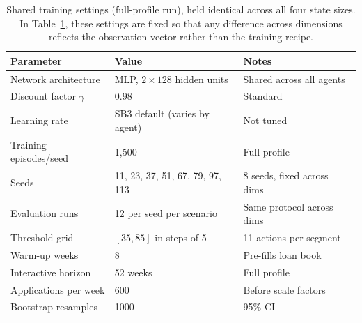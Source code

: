 \documentclass[preprint,review,authoryear,12pt]{elsarticle}
\begin{document}
\begin{table}[H]
    \centering
    \small
    \caption{Shared training settings (full-profile run), held identical across all four state sizes. In Table~\ref{tab:hyperparams}, these settings are fixed so that any difference across dimensions reflects the observation vector rather than the training recipe.}
    \label{tab:hyperparams}
    \begin{tabular}{l l l}
        \toprule
        Parameter                & Value                           & Notes                      \\
        \midrule
        Network architecture     & MLP, $2\times 128$ hidden units & Shared across all agents   \\
        Discount factor $\gamma$ & $0.98$                          & Standard                   \\
        Learning rate            & SB3 default (varies by agent)   & Not tuned                  \\
        Training episodes/seed   & 1{,}500                         & Full profile               \\
        Seeds                    & 11, 23, 37, 51, 67, 79, 97, 113 & 8 seeds, fixed across dims \\
        Evaluation runs          & 12 per seed per scenario        & Same protocol across dims  \\
        Threshold grid           & $[35, 85]$ in steps of 5        & 11 actions per segment     \\
        Warm-up weeks            & 8                               & Pre-fills loan book        \\
        Interactive horizon      & 52 weeks                        & Full profile               \\
        Applications per week    & 600                             & Before scale factors       \\
        Bootstrap resamples      & 1000                            & 95\% CI                    \\
        \bottomrule
    \end{tabular}
\end{table}
\end{document}
